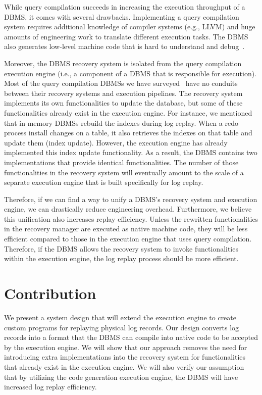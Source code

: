 \documentclass[12pt]{cmuthesis}
\begin{document}
While query compilation succeeds in increasing the execution throughput of a DBMS, it comes with several drawbacks. Implementing a query compilation system requires additional knowledge of compiler systems (e.g., LLVM) and huge amounts of engineering work to translate different execution tasks\cite{kersten18}. The DBMS also generates low-level machine code that is hard to understand and debug~\cite{kersten18}.

Moreover, the DBMS recovery system is isolated from the query compilation execution engine (i.e., a component of a DBMS that is responsible for execution). Most of the query compilation DBMSs we have surveyed~\cite{noisepage, neumann11, paroski16, craig14} have no conduits between their recovery systems and execution pipelines. The recovery system implements its own functionalities to update the database, but some of these functionalities already exist in the execution engine. For instance, we mentioned that in-memory DBMSs rebuild the indexes during log replay. When a redo process install changes on a table, it also retrieves the indexes on that table and update them (index update). However, the execution engine has already implemented this index update functionality. As a result, the DBMS contains two implementations that provide identical functionalities. The number of those functionalities in the recovery system will eventually amount to the scale of a separate execution engine that is built specifically for log replay.

Therefore, if we can find a way to unify a DBMS's recovery system and execution engine, we can drastically reduce engineering overhead. Furthermore, we believe this unification also increases replay efficiency. Unless the rewritten functionalities in the recovery manager are executed as native machine code, they will be less efficient compared to those in the execution engine that uses query compilation. Therefore, if the DBMS allows the recovery system to invoke functionalities within the execution engine, the log replay process should be more efficient.

\section{Contribution}
We present a system design that will extend the execution engine to create custom programs for replaying physical log records. Our design converts log records into a format that the DBMS can compile into native code to be accepted by the execution engine. We will show that our approach removes the need for introducing extra implementations into the recovery system for functionalities that already exist in the execution engine. We will also verify our assumption that by utilizing the code generation execution engine, the DBMS will have increased log replay efficiency.
\end{document}
